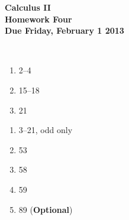 \documentclass[12pt]{article}
\begin{document}
\pagestyle{empty}
 
\begin{center}
{\large {\bf Calculus II}}\\
\medskip
{\large {\bf Homework Four}}\\
\medskip
{ {\bf Due Friday, February 1 2013}}\\
\end{center}
\hspace{2mm}\\



\begin{enumerate}
\setlength{\itemsep}{-1mm}
  \item 2--4
  \item 15--18
  \item 21
\end{enumerate}



\begin{enumerate}
\setlength{\itemsep}{-1mm}
  \item 3--21, odd only
  \item 53
  \item 58
  \item 59
  \item 89 ({\bf Optional})

\end{enumerate}

%


%
%


%
%
\end{document}
